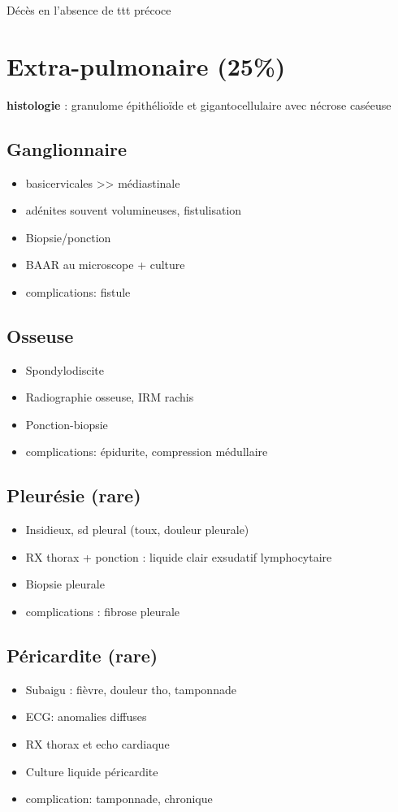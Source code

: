 \documentclass[a4paper,11pt,twoside,twocolumn]{article}
\begin{document}
Décès en l'absence de ttt précoce
\section*{Extra-pulmonaire (25\%)}
\label{sec:org047807f}
\textbf{\textbf{histologie}} : granulome épithélioïde et gigantocellulaire avec nécrose caséeuse
\subsection*{Ganglionnaire}
\label{sec:orgaee8db8}
\begin{itemize}
\item basicervicales >> médiastinale
\item adénites souvent volumineuses, fistulisation
\item Biopsie/ponction
\item BAAR au microscope + culture
\item complications: fistule
\end{itemize}
\subsection*{Osseuse}
\label{sec:org0500cde}
\begin{itemize}
\item Spondylodiscite
\item Radiographie osseuse, IRM rachis
\item Ponction-biopsie
\item complications: épidurite, compression médullaire
\end{itemize}
\subsection*{Pleurésie (rare)}
\label{sec:orgf3f21d2}
\begin{itemize}
\item Insidieux, sd pleural (toux, douleur pleurale)
\item RX thorax + ponction : liquide clair exsudatif lymphocytaire
\item Biopsie pleurale
\item complications : fibrose pleurale
\end{itemize}
\subsection*{Péricardite (rare)}
\label{sec:orga2a4bc1}
\begin{itemize}
\item Subaigu : fièvre, douleur tho, tamponnade
\item ECG: anomalies diffuses
\item RX thorax et echo  cardiaque
\item Culture liquide péricardite
\item complication: tamponnade, chronique
\end{itemize}
\end{document}
